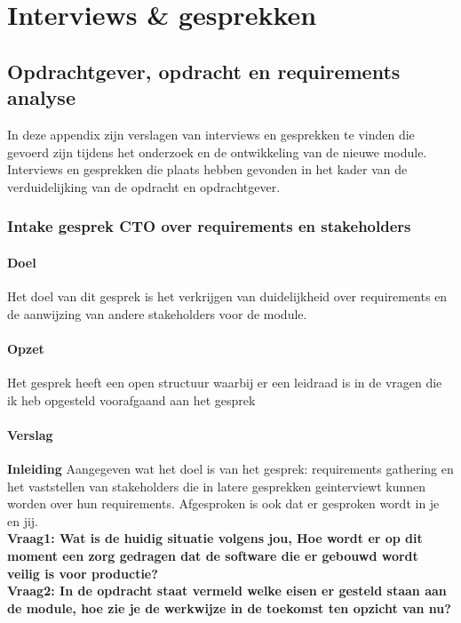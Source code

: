 
\chapter{Interviews \& gesprekken}


\section{Opdrachtgever, opdracht en requirements analyse}
In deze appendix zijn verslagen van interviews en gesprekken te vinden die gevoerd zijn tijdens het onderzoek en de ontwikkeling van de nieuwe module.
Interviews en gesprekken die plaats hebben gevonden in het kader van de verduidelijking van de opdracht en opdrachtgever.

  \subsection{Intake gesprek CTO over requirements en stakeholders}
  \subsubsection{Doel}
Het doel van dit gesprek is het verkrijgen van duidelijkheid over requirements en de aanwijzing van andere stakeholders voor de module.
  \subsubsection{Opzet}
Het gesprek heeft een open structuur waarbij er een leidraad is in de vragen die ik heb opgesteld voorafgaand aan het gesprek
\subsubsection{Verslag}
\textbf{Inleiding}
Aangegeven wat het doel is van het gesprek: requirements gathering en het vaststellen van stakeholders die in latere gesprekken geinterviewt kunnen worden over hun requirements. Afgesproken is ook dat er gesproken wordt in je en jij.\\
\textbf{Vraag1: Wat is de huidig situatie volgens jou, Hoe wordt er op dit moment een zorg gedragen dat de software die er gebouwd wordt veilig is voor productie?}
\lipsum[01]\\

\textbf{Vraag2: In de opdracht staat vermeld welke eisen er gesteld staan aan de module, hoe zie je de werkwijze in de toekomst ten opzicht van nu?}
\lipsum[03]\\

